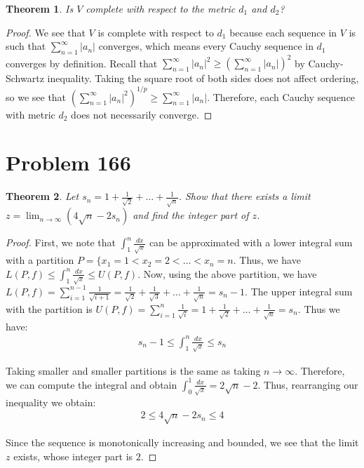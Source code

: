 \documentclass[psamsfonts]{amsart}
\newtheorem{thm}{Theorem}[section]
\theoremstyle{definition}
\theoremstyle{remark}
\numberwithin{equation}{section}
\begin{document}
\begin{thm}
Is $V$ complete with respect to the metric $d_1$ and $d_2$?
\end{thm}

\begin{proof}
We see that $V$ is complete with respect to $d_1$ because each sequence in $V$ is such that $\sum_{n=1}^\infty |a_n|$ converges, which means every Cauchy sequence in $d_1$ converges by definition. Recall that $\sum_{n=1}^\infty |a_n|^2 \geq \left( \sum_{n=1}^\infty |a_n| \right)^2$ by Cauchy-Schwartz inequality. Taking the square root of both sides does not affect ordering, so we see that $(\sum_{n=1}^\infty |a_n|^2 )^{1/p} \geq \sum_{n=1}^\infty |a_n|$. Therefore, each Cauchy sequence with metric $d_2$ does not necessarily converge. 
\end{proof}

\section{Problem 166}

\begin{thm}
Let $s_n = 1 + \frac{1}{\sqrt{2}} + \ldots + \frac{1}{\sqrt{n}}$. Show that there exists a limit $z = \lim_{n \to \infty} (4 \sqrt{n} - 2 s_n )$ and find the integer part of $z$. 
\end{thm}

\begin{proof}
First, we note that $\int_1^n \frac{dx}{\sqrt{x}}$ can be approximated with a lower integral sum with a partition $P = \{ x_1 = 1< x_2 = 2 < \ldots< x_n = n$. Thus, we have $L(P,f) \leq \int_1^n \frac{dx}{\sqrt{x}} \leq U(P,f)$. Now, using the above partition, we have $L(P,f) = \sum_{i=1}^{n-1} \frac{1}{\sqrt{i+1}} = \frac{1}{\sqrt{2}} + \frac{1}{\sqrt{3}} + \ldots + \frac{1}{\sqrt{n}} = s_n - 1$. The upper integral sum with the partition is $U(P,f) = \sum_{i=1}^n \frac{1}{\sqrt{i}} = 1 + \frac{1}{\sqrt{2}} + \ldots + \frac{1}{\sqrt{n}} = s_n$. Thus we have:
\begin{eqnarray}
s_n - 1 \leq \int_1^n \frac{dx}{\sqrt{x}} \leq s_n
\end{eqnarray}

Taking smaller and smaller partitions is the same as taking $n \to \infty$. Therefore, we can compute the integral and obtain $\int_0^1 \frac{dx}{\sqrt{x}} = 2\sqrt{n} - 2$. Thus, rearranging our inequality we obtain:
\begin{eqnarray}
2 \leq 4 \sqrt{n} - 2 s_n \leq 4
\end{eqnarray}

Since the sequence is monotonically increasing and bounded, we see that the limit $z$ exists, whose integer part is $2$.
\end{proof}
\end{document}

